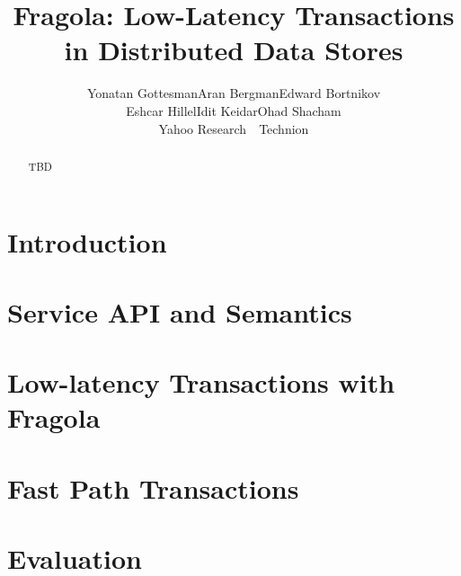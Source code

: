 \documentclass[letterpaper,twocolumn,10pt]{article}
\newcommand{\tb}{\hspace{5mm}}
\newcommand{\sys}{Fragola}
\begin{document}
\date{}

\title{\Large \bf\sys: Low-Latency Transactions in Distributed Data Stores}

\author{
{\rm Yonatan Gottesman\footnotemark[1]\tb Aran Bergman\footnotemark[2]\tb   Edward Bortnikov\footnotemark[1] }\\ 
{\rm Eshcar Hillel\footnotemark[1]\tb Idit Keidar\footnotemark[1] \footnotemark[2]\tb Ohad Shacham\footnotemark[1]}\\
	\footnotemark[1] Yahoo Research\ \ \footnotemark[2] Technion
} %


\maketitle




\begin{abstract}
TBD
\end{abstract}


\section{Introduction} \label{sec:intro}
 

\section{Service API and Semantics} \label{sec:api}


\section{Low-latency Transactions with \sys} \label{sec:ll}



\section{Fast Path Transactions}
\label{sec:alg}


\section{Evaluation} \label{sec:eval}

\end{document}
